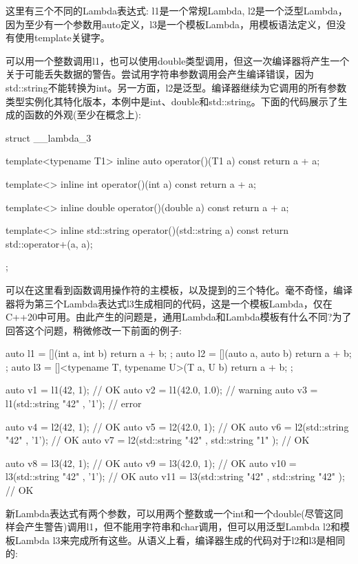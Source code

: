 这里有三个不同的Lambda表达式: l1是一个常规Lambda, l2是一个泛型Lambda，因为至少有一个参数用auto定义，l3是一个模板Lambda，用模板语法定义，但没有使用template关键字。

可以用一个整数调用l1，也可以使用double类型调用，但这一次编译器将产生一个关于可能丢失数据的警告。尝试用字符串参数调用会产生编译错误，因为std::string不能转换为int。另一方面，l2是泛型。编译器继续为它调用的所有参数类型实例化其特化版本，本例中是int、double和std::string。下面的代码展示了生成的函数的外观(至少在概念上):

\begin{cpp}
struct __lambda_3
{
	template<typename T1>
	inline auto operator()(T1 a) const
	{
		return a + a;
	}

	template<>
	inline int operator()(int a) const
	{
		return a + a;
	}

	template<>
	inline double operator()(double a) const
	{
		return a + a;
	}

	template<>
	inline std::string operator()(std::string a) const
	{
		return std::operator+(a, a);
	}
};
\end{cpp}

可以在这里看到函数调用操作符的主模板，以及提到的三个特化。毫不奇怪，编译器将为第三个Lambda表达式l3生成相同的代码，这是一个模板Lambda，仅在C++20中可用。由此产生的问题是，通用Lambda和Lambda模板有什么不同?为了回答这个问题，稍微修改一下前面的例子:

\begin{cpp}
auto l1 = [](int a, int b) {return a + b; };
auto l2 = [](auto a, auto b) {return a + b; };
auto l3 = []<typename T, typename U>(T a, U b)
          { return a + b; };
          
auto v1 = l1(42, 1); // OK
auto v2 = l1(42.0, 1.0); // warning
auto v3 = l1(std::string{ "42" }, '1'); // error

auto v4 = l2(42, 1); // OK
auto v5 = l2(42.0, 1); // OK
auto v6 = l2(std::string{ "42" }, '1'); // OK
auto v7 = l2(std::string{ "42" }, std::string{ "1" }); // OK

auto v8 = l3(42, 1); // OK
auto v9 = l3(42.0, 1); // OK
auto v10 = l3(std::string{ "42" }, '1'); // OK
auto v11 = l3(std::string{ "42" }, std::string{ "42" }); // OK
\end{cpp}

新Lambda表达式有两个参数，可以用两个整数或一个int和一个double(尽管这同样会产生警告)调用l1，但不能用字符串和char调用，但可以用泛型Lambda l2和模板Lambda l3来完成所有这些。从语义上看，编译器生成的代码对于l2和l3是相同的:

